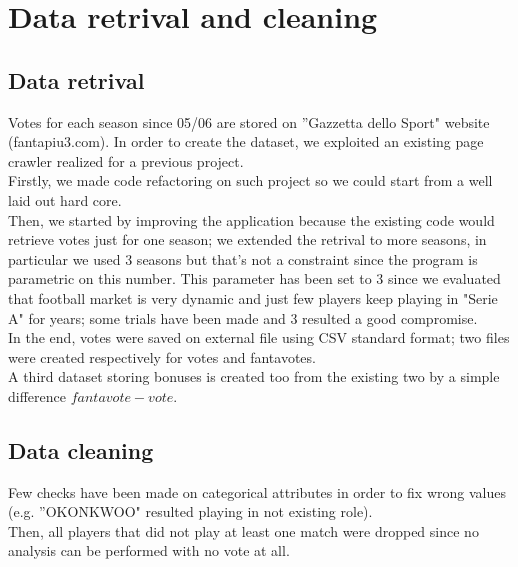 \chapter {Data retrival and cleaning}

\section{Data retrival}
Votes for each season since 05/06 are stored on ''Gazzetta dello Sport" website (fantapiu3.com).
In order to create the dataset, we exploited an existing page crawler realized for a previous project.
\\
Firstly, we made code refactoring on such project so we could start from a well laid out hard core.
\\
Then, we started by improving the application because the existing code would retrieve votes just for one season; we extended the retrival to more seasons, in particular we used 3 seasons but that's not a constraint since the program is parametric on this number. 
This parameter has been set to 3 since we evaluated that football market is very dynamic and just few players keep playing in "Serie A" for years;
some trials have been made and 3 resulted a good compromise.
\\
In the end, votes were saved on external file using CSV standard format; two files were created respectively for votes and fantavotes.
\\
A third dataset storing bonuses is created too from the existing two by a simple difference $fantavote - vote$.

\section{Data cleaning}  

Few checks have been made on categorical attributes in order to fix wrong values (e.g. ''OKONKWOO" resulted  playing in not existing role).
\\
Then, all players that did not play at least one match were dropped since no analysis can be performed with no vote at all.
  